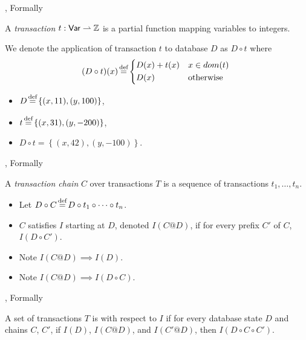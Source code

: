 \documentclass[xcolor={dvipsnames,svgnames,table}]{beamer}
\newcommand{\defeq}{\stackrel{\mathclap{\normalfont\mbox{\scriptsize def}}}{=}}
\newcommand{\set}[1]{\left\{#1\right\}}
\begin{document}
\begin{frame}{\iconfluence{}, Formally}
  \begin{center}
    \huge
    A \emph{transaction} $t: \textsf{Var} \rightharpoonup \mathbb{Z}$ is a partial function
    mapping variables to integers.
  \end{center}
  We denote the application of transaction $t$ to database $D$ as $D \circ t$
  where
  \[
    (D \circ t)(x) \defeq \begin{cases*}
      D(x) + t(x) & $x \in dom(t)$ \\
      D(x)        & otherwise
    \end{cases*}
  \]
  \begin{itemize}
    \item $D \defeq \set{(x, 11), (y, 100)}$,
    \item $t \defeq \set{(x, 31), (y, -200)}$,
    \item $D \circ t = \set{(x, 42), (y, -100)}$.
  \end{itemize}
\end{frame}

\begin{frame}{\iconfluence{}, Formally}
  \begin{center}
    \huge
    A \emph{transaction chain} $C$ over transactions $T$ is a sequence of
    transactions $t_1, \ldots, t_n$.
  \end{center}
  \begin{itemize}
    \item Let $D \circ C \defeq D \circ t_1 \circ \cdots \circ t_n$.
    \item
      $C$ satisfies $I$ starting at $D$, denoted $I(C @ D)$, if for every
      prefix $C'$ of $C$, $I(D \circ C')$.
    \item
      Note $I(C@D) \implies I(D)$.
    \item
      Note $I(C@D) \implies I(D \circ C)$.
  \end{itemize}
\end{frame}

\begin{frame}{\iconfluence{}, Formally}
  \begin{center}
    \huge
    A set of transactions $T$ is \emph{\iconfluent{}} with respect to $I$ if
    for every database state $D$ and chains $C$, $C'$, if $I(D)$, $I(C@D)$, and
    $I(C'@D)$, then $I(D \circ C \circ C')$.
  \end{center}
\end{frame}

\iconfluenceintuitively{}
\end{document}
